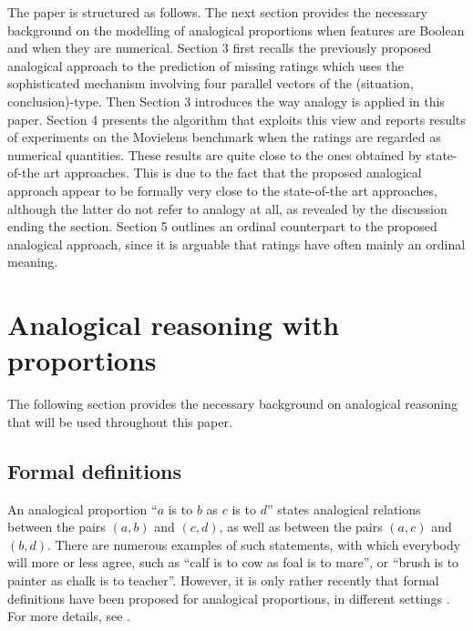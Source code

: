\documentclass[conference]{IEEEtran}
\begin{document}
The paper is structured as follows. The next section provides the necessary
background on the modelling of analogical proportions when features are Boolean
and when they are numerical. Section 3 first recalls the previously proposed
analogical approach to the prediction of missing ratings which uses the
sophisticated mechanism involving four parallel vectors of the (situation,
conclusion)-type. Then Section 3 introduces the way analogy is applied in this
paper. Section 4 presents the algorithm that exploits this view and reports
results of experiments on the Movielens benchmark when the ratings are regarded as
numerical quantities. These results are quite close to the ones obtained by
state-of-the art approaches. This is due to the fact that the proposed
analogical approach appear to be formally very close to the state-of-the art
approaches, although the latter do not refer to analogy at all, as revealed by
the discussion ending the section.  Section 5 outlines an ordinal counterpart
to the proposed analogical approach, since it is arguable that ratings have
often mainly an ordinal meaning.

\section{Analogical reasoning with proportions}
The following section provides the necessary background on analogical
reasoning that will be used throughout this paper.

\subsection{Formal definitions}
An analogical proportion ``$a$ is to $b$ as $c$ is to $d$'' states analogical
relations between the pairs $(a,b)$ and $(c,d)$, as well as between the pairs
$(a,c)$ and $(b,d)$.  There are numerous examples of such statements, with
which everybody will more or less agree, such as  ``calf is to cow as foal is
to mare'', or ``brush is to painter as chalk is to teacher''. However, it is
only rather recently that formal definitions have been proposed for analogical
proportions, in different settings
\cite{StroppaYvon2006,LepageHDR2003,MicPraECSQARU2009}.
For more details, see \cite{PraRicLU2013,PraRicECSQARU2013,PraRicIFCOLOG2014}.
\end{document}
